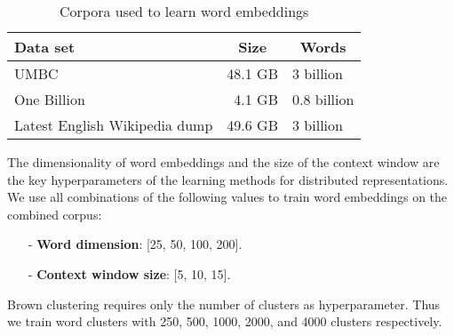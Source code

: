\begin{table}[h]\centering\small
\begin{tabular}{lrl}
\hline
\textbf{Data set} & \multicolumn{1}{c}{\textbf{Size}} & \multicolumn{1}{c}{\textbf{Words}} \\ \hline
UMBC 	& 48.1 GB & 3 billion \\
One Billion 	& 4.1 GB & 0.8 billion  \\
Latest English Wikipedia dump & 49.6 GB & 3 billion \\ \hline
\end{tabular}
\caption{Corpora used to learn word embeddings}
\label{wordEmbedCorpora}
\end{table}

The dimensionality of word embeddings and the size of the context window are the key hyperparameters of the learning methods for distributed representations. We use all combinations of the following values to train word embeddings on the combined corpus:
\begin{itemize}\small
\item[-]\textbf{Word dimension}: [25, 50, 100, 200].
\item[-]\textbf{Context window size}: [5, 10, 15].
\end{itemize}
Brown clustering requires only the number of clusters as hyperparameter. Thus we train word clusters with 250, 500, 1000, 2000, and 4000 clusters respectively. 
%
%
%
%
%
